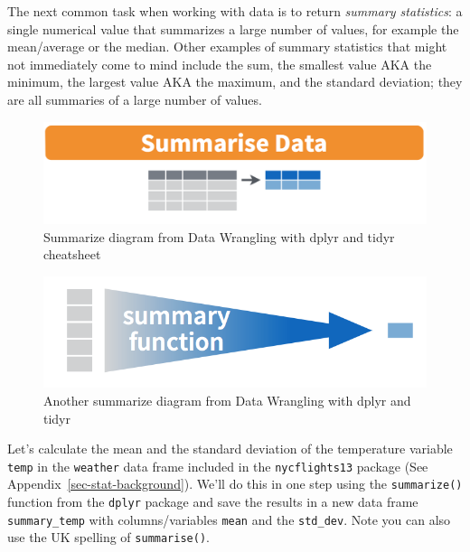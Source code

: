 \documentclass[
  letterpaper,
  DIV=11,
  numbers=noendperiod]{scrreprt}
\theoremstyle{definition}
\theoremstyle{remark}
\begin{document}
The next common task when working with data is to return \emph{summary
statistics}: a single numerical value that summarizes a large number of
values, for example the mean/average or the median. Other examples of
summary statistics that might not immediately come to mind include the
sum, the smallest value AKA the minimum, the largest value AKA the
maximum, and the standard deviation; they are all summaries of a large
number of values.

\begin{figure}

{\centering \includegraphics{images/summarize1.png}

}

\caption{Summarize diagram from Data Wrangling with dplyr and tidyr
cheatsheet}

\end{figure}

\begin{figure}

{\centering \includegraphics{images/summary.png}

}

\caption{Another summarize diagram from Data Wrangling with dplyr and
tidyr}

\end{figure}

Let's calculate the mean and the standard deviation of the temperature
variable \texttt{temp} in the \texttt{weather} data frame included in
the \texttt{nycflights13} package (See
Appendix~\ref{sec-stat-background}). We'll do this in one step using the
\texttt{summarize()} function from the \texttt{dplyr} package and save
the results in a new data frame \texttt{summary\_temp} with
columns/variables \texttt{mean} and the \texttt{std\_dev}. Note you can
also use the UK spelling of \texttt{summarise()}.
\end{document}
